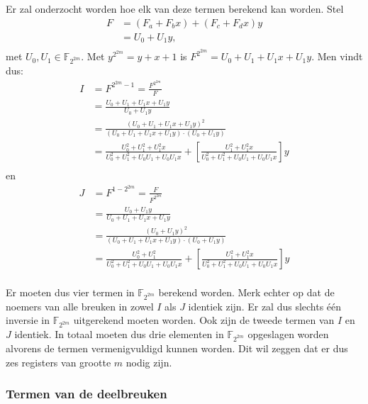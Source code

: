 Er zal onderzocht worden hoe elk van deze termen berekend kan worden. Stel
\[\begin{aligned}
F	&= (F_a + F_b x) + (F_c + F_d x)y\\
	&= U_0 + U_1y,\\
\end{aligned}\]
met $U_0, U_1 \in \mathbb{F}_{2^{2m}}$. Met $y^{2^{2m}} = y + x + 1$ is $F^{2^{2m}} = U_0 + U_1 + U_1x + U_1y$. 	Men vindt dus:
\[\begin{aligned}
I  &= F^{2^{2m} - 1} = \frac{F^{2^{2m}}}{F}\\
	&= \frac{U_0 + U_1 + U_1x + U_1y}{U_0 + U_1y}\\
	&= \frac{(U_0 + U_1 + U_1x + U_1y)^2}{(U_0 + U_1 + U_1x + U_1y) \cdot (U_0 + U_1y)}\\
	&= \frac{U_0^2 + U_1^2 + U_1^2x}{U_0^2 + U_1^2 + U_0 U_1 + U_0 U_1 x} + \left[\frac{U_1^2 + U_1^2x}{U_0^2 + U_1^2 + U_0 U_1 + U_0 U_1 x}\right]y\\
\end{aligned}\]
en
\[\begin{aligned}
J  &= F^{1 - 2^{2m}} = \frac{F}{F^{2^{2m}}}\\
	&= \frac{U_0 + U_1y}{U_0 + U_1 + U_1x + U_1y}\\
	&= \frac{(U_0 + U_1y)^2}{(U_0 + U_1 + U_1x + U_1y) \cdot (U_0 + U_1y)}\\
	&= \frac{U_0^2 + U_1^2}{U_0^2 + U_1^2 + U_0 U_1 + U_0 U_1 x} + \left[\frac{U_1^2 + U_1^2x}{U_0^2 + U_1^2 + U_0 U_1 + U_0 U_1 x}\right]y\\
\end{aligned}\]

Er moeten dus vier termen in $\mathbb{F}_{2^{2m}}$ berekend worden. Merk echter op dat de noemers van alle breuken in zowel $I$ als $J$ identiek zijn. Er zal dus slechts \'e\'en inversie in $\mathbb{F}_{2^{2m}}$ uitgerekend moeten worden. Ook zijn de tweede termen van $I$ en $J$ identiek. In totaal moeten dus drie elementen in $\mathbb{F}_{2^{2m}}$ opgeslagen worden alvorens de termen  vermenigvuldigd kunnen worden. Dit wil zeggen dat er dus zes registers van grootte $m$ nodig zijn.

\subsubsection{Termen van de deelbreuken}


